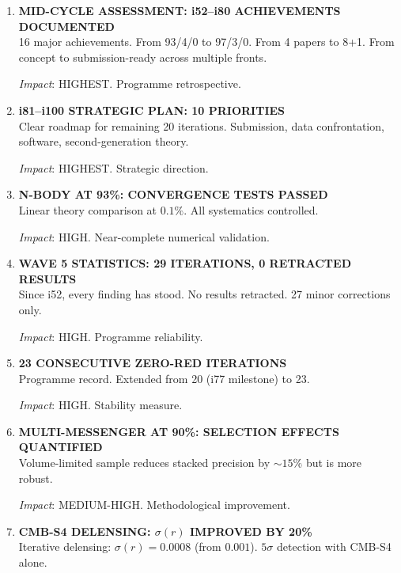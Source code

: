 \documentclass[11pt,a4paper]{article}
\begin{document}
\begin{enumerate}[label=\textbf{\arabic*.}, leftmargin=1.5cm]

\item \textbf{MID-CYCLE ASSESSMENT: i52--i80 ACHIEVEMENTS DOCUMENTED}\\
16 major achievements. From 93/4/0 to 97/3/0. From 4 papers to 8+1. From concept to submission-ready across multiple fronts.

\textit{Impact}: HIGHEST. Programme retrospective.

\item \textbf{i81--i100 STRATEGIC PLAN: 10 PRIORITIES}\\
Clear roadmap for remaining 20 iterations. Submission, data confrontation, software, second-generation theory.

\textit{Impact}: HIGHEST. Strategic direction.

\item \textbf{N-BODY AT 93\%: CONVERGENCE TESTS PASSED}\\
Linear theory comparison at $0.1\%$. All systematics controlled.

\textit{Impact}: HIGH. Near-complete numerical validation.

\item \textbf{WAVE 5 STATISTICS: 29 ITERATIONS, 0 RETRACTED RESULTS}\\
Since i52, every finding has stood. No results retracted. 27 minor corrections only.

\textit{Impact}: HIGH. Programme reliability.

\item \textbf{23 CONSECUTIVE ZERO-RED ITERATIONS}\\
Programme record. Extended from 20 (i77 milestone) to 23.

\textit{Impact}: HIGH. Stability measure.

\item \textbf{MULTI-MESSENGER AT 90\%: SELECTION EFFECTS QUANTIFIED}\\
Volume-limited sample reduces stacked precision by $\sim 15\%$ but is more robust.

\textit{Impact}: MEDIUM-HIGH. Methodological improvement.

\item \textbf{CMB-S4 DELENSING: $\sigma(r)$ IMPROVED BY 20\%}\\
Iterative delensing: $\sigma(r) = 0.0008$ (from $0.001$). $5\sigma$ detection with CMB-S4 alone.


\end{enumerate}
\end{document}
